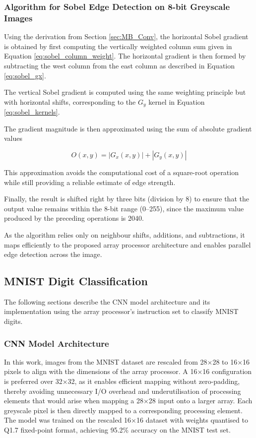             \subsubsection{Algorithm for Sobel Edge Detection on 8-bit Greyscale Images}
            
            Using the derivation from Section \ref{sec:MB_Conv}, the horizontal Sobel gradient is obtained by first computing the vertically weighted column sum given in Equation \ref{eq:sobel_column_weight}.  
            The horizontal gradient is then formed by subtracting the west column from the east column as described in Equation \ref{eq:sobel_gx}.
            
            The vertical Sobel gradient is computed using the same weighting principle but with horizontal shifts, corresponding to the $G_y$ kernel in Equation \ref{eq:sobel_kernels}.
            
            The gradient magnitude is then approximated using the sum of absolute gradient values
            
            \begin{equation}
            O(x,y)=|G_x(x,y)|+|G_y(x,y)|
            \label{eq:sobel_output}
            \end{equation}

            This approximation avoids the computational cost of a square-root operation while still providing a reliable estimate of edge strength.
            
            Finally, the result is shifted right by three bits (division by 8) to ensure that the output value remains within the 8-bit range (0–255), since the maximum value produced by the preceding operations is 2040.
            
            As the algorithm relies only on neighbour shifts, additions, and subtractions, it maps efficiently to the proposed array processor architecture and enables parallel edge detection across the image.

    \subsection{MNIST Digit Classification}\label{sec:MNIST}
        The following sections describe the CNN model architecture and its implementation using the array processor's instruction set to classify MNIST digits.

        \subsubsection{CNN Model Architecture}  
        In this work, images from the MNIST dataset are rescaled from 28×28 to 16×16 pixels to align with the dimensions of the array processor. A 16×16 configuration is preferred over 32×32, as it enables efficient mapping without zero-padding, thereby avoiding unnecessary I/O overhead and underutilisation of processing elements that would arise when mapping a 28×28 input onto a larger array. Each greyscale pixel is then directly mapped to a corresponding processing element. The model was trained on the rescaled 16×16 dataset with weights quantised to Q1.7 fixed-point format, achieving 95.2\% accuracy on the MNIST test set.
        
